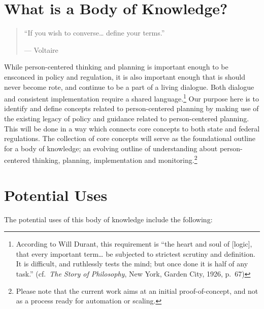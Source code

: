 \documentclass[
]{book}
\begin{document}
\hypertarget{what-is-a-body-of-knowledge}{%
\section{What is a Body of Knowledge?}\label{what-is-a-body-of-knowledge}}

\begin{quote}
``If you wish to converse\ldots{} define your terms.''

--- Voltaire
\end{quote}

While person-centered thinking and planning is important enough to be ensconced in policy and regulation, it is also important enough that is should never become rote, and continue to be a part of a living dialogue. Both dialogue and consistent implementation require a shared language.\footnote{According to Will Durant, this requirement is ``the heart and soul of {[}logic{]}, that every important term\ldots{} be subjected to strictest scrutiny and definition. It is difficult, and ruthlessly tests the mind; but once done it is half of any task.'' (cf.~\emph{The Story of Philosophy}, New York, Garden City, 1926, p.~67)} Our purpose here is to identify and define concepts related to person-centered planning by making use of the existing legacy of policy and guidance related to person-centered planning. This will be done in a way which connects core concepts to both state and federal regulations. The collection of core concepts will serve as the foundational outline for a body of knowledge; an evolving outline of understanding about person-centered thinking, planning, implementation and monitoring.\footnote{Please note that the current work aims at an initial proof-of-concept, and not as a process ready for automation or scaling.}

\hypertarget{potential-uses}{%
\section{Potential Uses}\label{potential-uses}}

The potential uses of this body of knowledge include the following:
\end{document}
